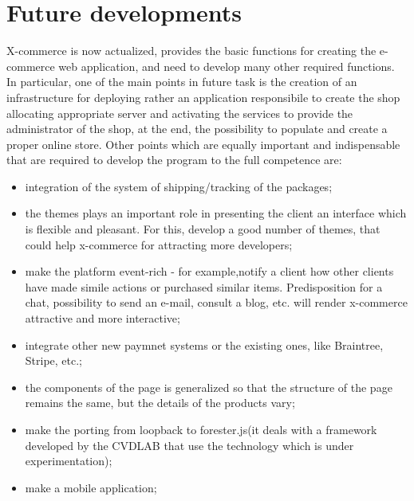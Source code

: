 \section{Future developments}
\label{sec:future_work}
X-commerce is now actualized, provides the basic functions for creating the e-commerce web application, and need to develop many other required functions.
In particular, one of the main points in future task is the creation of an infrastructure for deploying rather an application responsibile to create the shop allocating appropriate server and activating the services to provide the administrator of the shop, at the end, the possibility to populate and create a proper online store.
\newline
Other points which are equally important and indispensable that are required to develop the program to the full competence are:
\begin{itemize}
\item integration of the system of shipping/tracking of the packages;
\item the themes plays an important role in presenting the client an interface which is flexible and pleasant. For this, develop a good number of themes, that could help x-commerce for attracting more developers;
\item make the platform event-rich - for example,notify a client how other clients have made simile actions or purchased similar items. Predisposition for a chat, possibility to send an e-mail, consult a blog, etc. will render x-commerce attractive and more interactive;
\item integrate other new paymnet systems or the existing ones, like Braintree, Stripe, etc.;
\item the components of the page is generalized so that the structure of the page remains the same, but the details of the products vary;
\item make the porting from loopback to forester.js(it deals with a framework developed by the CVDLAB that use the technology which is under experimentation);
\item make a mobile application;
\end{itemize}